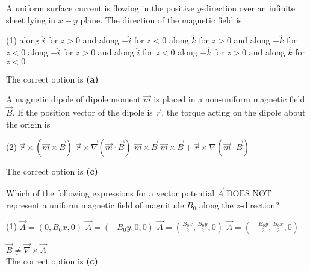 \begin{enumerate}
	\begin{minipage}{\textwidth}
		\item A uniform surface current is flowing in the positive $y$-direction over an infinite sheet lying in $x-y$ plane. The direction of the magnetic field is
	\end{minipage}
	\begin{tasks}(1)
		\task[\textbf{A.}]along $\hat{i}$ for $z>0$ and along $-\hat{i}$ for $z<0$
		\task[\textbf{B.}]along $\hat{k}$ for $z>0$ and along $-\hat{k}$ for $z<0$
		\task[\textbf{C.}]along $-\hat{i}$ for $z>0$ and along $\hat{i}$ for $z<0$
		\task[\textbf{D.}]along $-\hat{k}$ for $z>0$ and along $\hat{k}$ for $z<0$
	\end{tasks}
	\begin{answer}
		The correct option is \textbf{(a)}
	\end{answer}
\begin{minipage}{\textwidth}
	\item A magnetic dipole of dipole moment $\vec{m}$ is placed in a non-uniform magnetic field $\vec{B} .$ If the position vector of the dipole is $\vec{r}$, the torque acting on the dipole about the origin is
\end{minipage}
\begin{tasks}(2)
	\task[\textbf{A.}] $\vec{r} \times(\vec{m} \times \vec{B})$
	\task[\textbf{B.}]$\vec{r} \times \vec{\nabla}(\vec{m} \cdot \vec{B})$
	\task[\textbf{C.}]$\vec{m} \times \vec{B}$
	\task[\textbf{D.}]$\vec{m} \times \vec{B}+\vec{r} \times \nabla(\vec{m} \cdot \vec{B})$
\end{tasks}
\begin{answer}
	The correct option is \textbf{(c)}
\end{answer}
	\begin{minipage}{\textwidth}
		\item Which of the following expressions for a vector potential $\vec{A} \underline{\text { DOES NOT }}$ represent a uniform magnetic field of magnitude $B_{0}$ along the $z$-direction?
	\end{minipage}
	\begin{tasks}(1)
		\task[\textbf{A.}] $\vec{A}=\left(0, B_{0} x, 0\right)$
		\task[\textbf{B.}]$\vec{A}=\left(-B_{0} y, 0,0\right)$
		\task[\textbf{C.}]$\vec{A}=\left(\frac{B_{0} x}{2}, \frac{B_{0} y}{2}, 0\right)$
		\task[\textbf{D.}] $\vec{A}=\left(-\frac{B_{0} y}{2}, \frac{B_{0} x}{2}, 0\right)$
	\end{tasks}
	\begin{answer}
		$\vec{B} \neq \vec{\nabla} \times \vec{A}$\\
		The correct option is \textbf{(c)}	
	\end{answer}
	

\end{enumerate}
